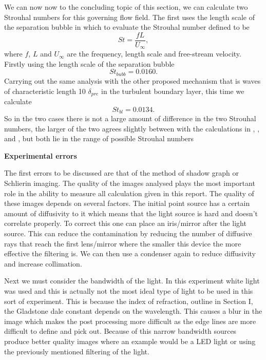 \documentclass[a4paper,10pt,twoside]{article}
\begin{document}
\begin{multicols}{2}
We can now now to the concluding topic of this section, we can calculate two Strouhal numbers for this governing flow field. The first uses the length scale of the separation bubble in which to evaluate the Strouhal number \cite{5} defined to be
\begin{equation}
    St = \frac{f L}{U_\infty},
\end{equation}
where $f$, $L$ and $U_\infty$ are the frequency, length scale and free-stream velocity. Firstly using the length scale of the separation bubble 
\begin{equation}
    St_{bubb} = 0.0160.
\end{equation}
Carrying out the same analysis with the other proposed mechanism that is waves of characteristic length 10 $\delta_{pre}$ in the turbulent boundary layer, this time we calculate
\begin{equation}
    St_{bl} = 0.0134.
\end{equation}
So in the two cases there is not a large amount of difference in the two Strouhal numbers, the larger of the two agrees slightly between with the calculations in \cite{3}, \cite{5}, \cite{6} and \cite{7}, but both lie in the range of possible Strouhal numbers





\vspace{5mm}
\centerline{\textbf{Experimental errors}}
\vspace{5mm}





The first errors to be discussed are that of the method of shadow graph or Schlierin imaging. The quality of the images analysed plays the most important role in the ability to measure all calculation given in this report. The quality of these images depends on several factors. The initial point source has a certain amount of diffusivity to it which means that the light source is hard and doesn't correlate properly. To correct this one can place an iris/mirror after the light source. This can reduce the contamination by reducing the number of diffusive rays that reach the first lens/mirror where the smaller this device the more effective the filtering is. We can then use a condenser again to reduce diffusivity and increase collimation. \par



Next we must consider the bandwidth of the light. In this experiment white light was used and this is actually not the most ideal type of light to be used in this sort of experiment. This is because the index of refraction, outline in Section I, the Gladstone dale constant depends on the wavelength. This causes a blur in the image which makes the post processing more difficult as the edge lines are more difficult to define and pick out. Because of this narrow bandwidth sources produce better quality images where an example would be a LED light or using the previously mentioned filtering of the light. \par




\end{multicols}
\end{document}
